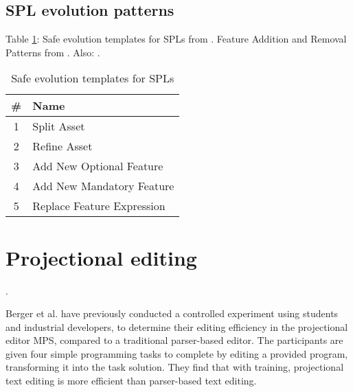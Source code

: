 \subsection{SPL evolution patterns}
Table \ref{tab:safeevo}: Safe evolution templates for SPLs from \cite{neves2011evolution}. Feature Addition and Removal Patterns from \cite{passos2016coevolution}. Also: \cite{stanciulescu2016concepts}.
\begin{table}[h]
    \centering
    \caption{Safe evolution templates for SPLs \cite{neves2011evolution}}
    \label{tab:safeevo}
    \begin{tabular}{c|l}
    \hline
        \textbf{\#} & \textbf{Name} \\\hline
        1 & Split Asset \\
        2 & Refine Asset \\
        3 & Add New Optional Feature \\
        4 & Add New Mandatory Feature \\
        5 & Replace Feature Expression
    \end{tabular}
\end{table}


\section{Projectional editing}
\cite{voelter2014towards} \cite{stanciulescu2016concepts} \cite{behringer2017peopl}.

Berger et al. \cite{berger2016mps} have previously conducted a controlled experiment using students and industrial developers, to determine their editing efficiency in the projectional editor MPS, compared to a traditional parser-based editor. The participants are given four simple programming tasks to complete by editing a provided program, transforming it into the task solution. They find that with training, projectional text editing is more efficient than parser-based text editing.

